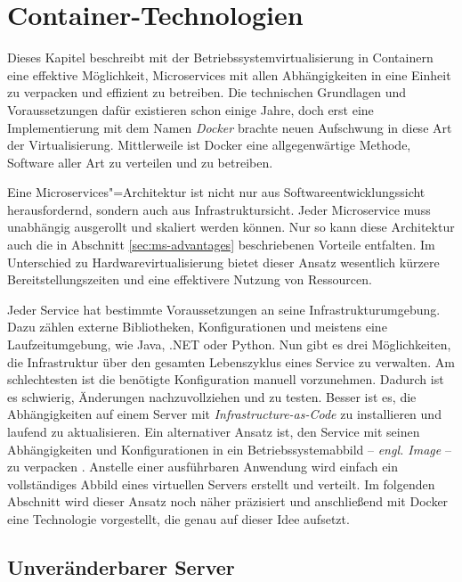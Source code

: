 \chapter{Container-Technologien}

Dieses Kapitel beschreibt mit der Betriebssystemvirtualisierung in Containern eine effektive Möglichkeit, Microservices mit allen Abhängigkeiten in eine Einheit zu verpacken und effizient zu betreiben. Die technischen Grundlagen und Voraussetzungen dafür existieren schon einige Jahre, doch erst eine Implementierung mit dem Namen \textit{Docker} brachte neuen Aufschwung in diese Art der Virtualisierung. Mittlerweile ist Docker eine allgegenwärtige Methode, Software aller Art zu verteilen und zu betreiben.

Eine Microservices"=Architektur ist nicht nur aus Softwareentwicklungssicht herausfordernd, sondern auch aus Infrastruktursicht. Jeder Microservice muss unabhängig ausgerollt und skaliert werden können. Nur so kann diese Architektur auch die in Abschnitt \ref{sec:ms-advantages} beschriebenen Vorteile entfalten. Im Unterschied zu Hardwarevirtualisierung bietet dieser Ansatz wesentlich kürzere Bereitstellungszeiten und eine effektivere Nutzung von Ressourcen.

Jeder Service hat bestimmte Voraussetzungen an seine Infrastrukturumgebung. Dazu zählen externe Bibliotheken, Konfigurationen und meistens eine Laufzeitumgebung, wie \zB Java, .NET oder Python. Nun gibt es drei Möglichkeiten, die Infrastruktur über den gesamten Lebenszyklus eines Service zu verwalten. Am schlechtesten ist die benötigte Konfiguration manuell vorzunehmen. Dadurch ist es schwierig, Änderungen nachzuvollziehen und zu testen. Besser ist es, die Abhängigkeiten auf einem Server mit \textit{Infrastructure-as-Code} zu installieren und laufend zu aktualisieren. Ein alternativer Ansatz ist, den Service mit seinen Abhängigkeiten und Konfigurationen in ein Betriebssystemabbild -- \textit{engl. Image} -- zu verpacken \cite[113]{newman2015building}. Anstelle einer ausführbaren Anwendung wird einfach ein vollständiges Abbild eines virtuellen Servers erstellt und verteilt. Im folgenden Abschnitt wird dieser Ansatz noch näher präzisiert und anschließend mit Docker eine Technologie vorgestellt, die genau auf dieser Idee aufsetzt.

\section{Unveränderbarer Server}

